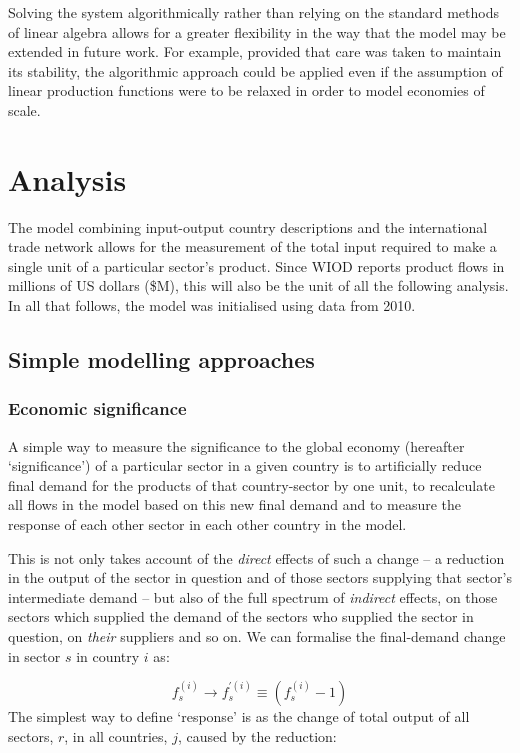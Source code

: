 \documentclass{article}
\begin{document}
Solving the system algorithmically rather than relying on the standard methods of linear algebra allows for a greater flexibility in the way that the model may be extended in future work. For example, provided that care was taken to maintain its stability, the algorithmic approach could be applied even if the assumption of linear production functions were to be relaxed in order to model economies of scale.


\section{Analysis}\label{sec:analysis}
The model combining input-output country descriptions and the international trade network allows for the measurement of the total input required to make a single unit of a particular sector's product.
Since WIOD reports product flows in millions of US dollars (\$M), this will also be the unit of all the following analysis.
In all that follows, the model was initialised using data from 2010.

\subsection{Simple modelling approaches}
\label{sec:simple_modelling_approaches}

\subsubsection*{Economic significance}
A simple way to measure the significance to the global economy (hereafter `significance') of a particular sector in a given country is to artificially reduce final demand for the products of that country-sector by one unit, to recalculate all flows in the model based on this new final demand and to measure the response of each other sector in each other country in the model.

This is not only takes account of the \textit{direct} effects of such a change -- a reduction in the output of the sector in question and of those sectors supplying that sector's intermediate demand -- but also of the full spectrum of \textit{indirect} effects, on those sectors which supplied the demand of the sectors who supplied the sector in question, on \textit{their} suppliers and so on.
We can formalise the final-demand change in sector $s$ in country $i$ as:

\begin{equation}\label{eqn:reduce_fd_by_one}
    f_s^{(i)} \rightarrow f_s^{\prime (i)} \equiv (f_s^{(i)} - 1)
\end{equation}
The simplest way to define `response' is as the change of total output of all sectors, $r$, in all countries, $j$, caused by the reduction:
\end{document}
